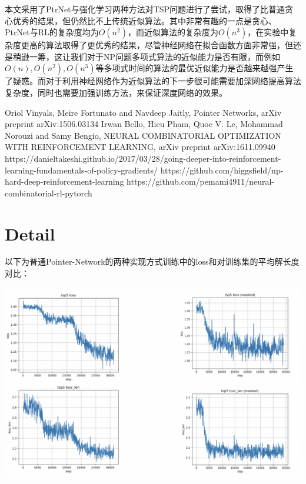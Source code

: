 \documentclass[a4paper]{article}
\begin{document}
本文采用了PtrNet与强化学习两种方法对TSP问题进行了尝试，取得了比普通贪心优秀的结果，但仍然比不上传统近似算法。其中非常有趣的一点是贪心、PtrNet与RL的复杂度均为$O(n^2)$，而近似算法的复杂度为$O(n^3)$，在实验中复杂度更高的算法取得了更优秀的结果，尽管神经网络在拟合函数方面非常强，但还是稍逊一筹，这让我们对于NP问题多项式算法的近似能力是否有限，而例如$O(n),O(n^2),O(n^3)$等多项式时间的算法的最优近似能力是否越来越强产生了疑惑。而对于利用神经网络作为近似算法的下一步很可能需要加深网络提高算法复杂度，同时也需要加强训练方法，来保证深度网络的效果。

\begin{thebibliography}{99}
Oriol Vinyals, Meire Fortunato and Navdeep Jaitly, Pointer Networks, arXiv preprint arXiv:1506.03134
Irwan Bello, Hieu Pham, Quoc V. Le, Mohammad Norouzi and Samy Bengio, NEURAL COMBINATORIAL OPTIMIZATION WITH REINFORCEMENT LEARNING, arXiv preprint arXiv:1611.09940
https://danieltakeshi.github.io/2017/03/28/going-deeper-into-reinforcement-learning-fundamentals-of-policy-gradients/
https://github.com/higgsfield/np-hard-deep-reinforcement-learning
https://github.com/pemami4911/neural-combinatorial-rl-pytorch
\end{thebibliography}

\section*{Detail}

以下为普通Pointer-Network的两种实现方式训练中的loss和对训练集的平均解长度对比：

\includegraphics[width=\textwidth]{../fig/pic2.png}
\end{document}
